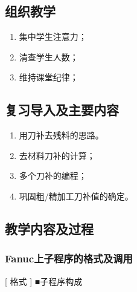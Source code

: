 \jxhj{%
	}

\makeshouye %

\subsection{组织教学}
\begin{enumerate}[\hspace{2em}1、]
	\item 集中学生注意力；
	\item 清查学生人数；
	\item 维持课堂纪律；
\end{enumerate}
\subsection{复习导入及主要内容}
\begin{enumerate}[1、]
	\item 用刀补去残料的思路。
\item 去材料刀补的计算；
\item 多个刀补的编程；
\item 巩固粗/精加工刀补值的确定。
\end{enumerate}

\subsection{教学内容及过程}

\subsubsection{Fanuc上子程序的格式及调用}
[ 格式 ]
■子程序构成



